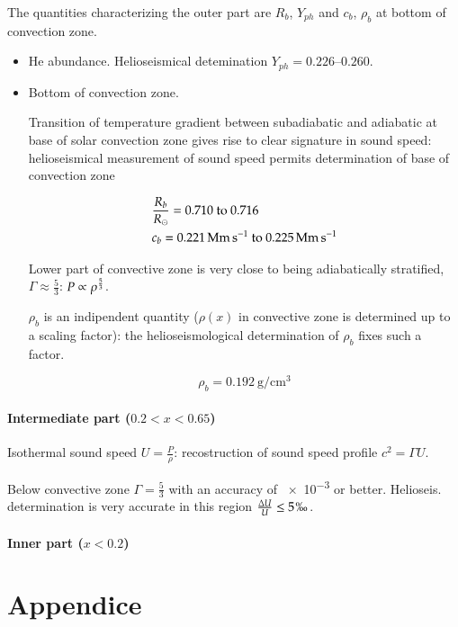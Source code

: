 \documentclass[oneside,12pt,fleqn]{memoir}
\begin{document}
The quantities characterizing the outer part are $R_b$, $Y_{ph}$ and $c_b$, $\rho_b$ at bottom of convection zone.

\begin{itemize}
    \item He abundance. Helioseismical detemination $Y_{ph}=\numrange{0.226}{0.260}$.
    
    \item Bottom of convection zone.
    
    Transition of temperature gradient between subadiabatic and adiabatic at base of solar convection zone gives rise to clear signature in sound speed: helioseismical measurement of sound speed permits determination of base of convection zone
    
    \begin{align*}
    &\frac{R_b}{\rsun{}}=\numrange{0.710}{0.716}\\
    &c_b=\SIrange{0.221}{0.225}{\mega\meter\per\second}
    \end{align*}
    
    Lower part of convective zone is very close to being adiabatically stratified, $\Gamma\approx\frac{5}{3}$: $P\propto\rho^{\frac{5}{3}}$.
    
    $\rho_b$ is an indipendent quantity ($\rho(x)$ in convective zone is determined up to a scaling factor): the helioseismological determination of $\rho_b$ fixes such a factor.
    
    \begin{equation*}
        \rho_b=\SI{0.192}{\gram\per\cubic\cm}
    \end{equation*}
    
\end{itemize}

\subsection{Intermediate part ($0.2<x<0.65$)}

Isothermal sound speed $U=\frac{P}{\rho}$: recostruction of sound speed profile $c^2=\Gamma U$.

Below convective zone $\Gamma=\frac{5}{3}$ with an accuracy of \num{e-3} or better. Helioseis. determination is very accurate in this region $\frac{\Delta U}{U}\leq5 \perthousand$.

\subsection{Inner part ($x<0.2$)}

\appendix
\part{Appendice}

\stopcontents[chapters]


\clearpage
{}
\printindex
\end{document}

